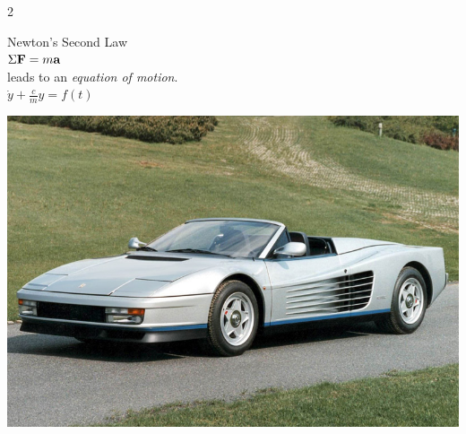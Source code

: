 \documentclass[fleqn]{beamer} %
\newcommand{\sectionIsubsectionIVtitle}{}
\begin{document}
			\begin{frame}
				\frametitle{\sectionIsubsectionIVtitle}
				\bigskip

				\begin {multicols}{2}

Newton's Second Law \vspace{2mm}\\

$\Sigma {\bf F}=m {\bf a}$ \vspace{2mm}\\

leads  to an {\it equation of motion}.  \vspace{2mm}\\

$\dot{y}+\frac{c}{m}y=f(t)$

 \includegraphics[scale=0.15]{images/ferrari.jpg}\\
 
 \end{multicols} 


				\btVFill
			\end{frame}
\end{document}
